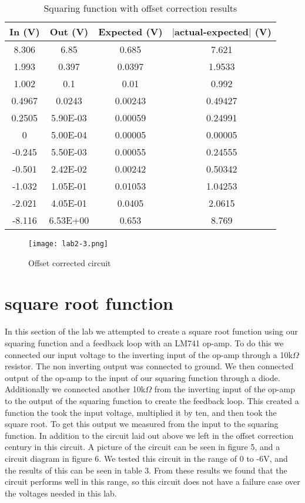 \documentclass[prl,12pt,notitlepage,aps,onecolumn,superscriptaddress]{revtex4-1}
\newcommand{\ohm}{$\Omega$ }
\begin{document}
\begin{table}[h]
 \centering
 \caption{Squaring function with offset correction results}
   \begin{tabular}{|c|c|c|c|}
   \toprule
 In (V)   & Out (V)  & Expected (V)  & $|$actual-expected$|$ (V) \\
   \midrule
   8.306 & 6.85  & 0.685 & 7.621 \\
   1.993 & 0.397 & 0.0397 & 1.9533 \\
   1.002 & 0.1   & 0.01  & 0.992 \\
   0.4967 & 0.0243 & 0.00243 & 0.49427 \\
   0.2505 & 5.90E-03 & 0.00059 & 0.24991 \\
   0     & 5.00E-04 & 0.00005 & 0.00005 \\
   -0.245 & 5.50E-03 & 0.00055 & 0.24555 \\
   -0.501 & 2.42E-02 & 0.00242 & 0.50342 \\
   -1.032 & 1.05E-01 & 0.01053 & 1.04253 \\
   -2.021 & 4.05E-01 & 0.0405 & 2.0615 \\
   -8.116 & 6.53E+00 & 0.653 & 8.769 \\
   \bottomrule
   \end{tabular}%
 \label{tab:addlabel}%
\end{table}%

\begin{figure}[h]
\begin{center}
\texttt{[image: lab2-3.png]}
\end{center}
\caption{\label{fig:pic} Offset corrected circuit}
\end{figure}

\section{square root function}
In this section of the lab we attempted to create a square root function using our squaring function and a feedback loop with an LM741 op-amp. To do this we connected our input voltage to the inverting input of the op-amp through a 10k\ohm resistor. The non inverting output was connected to ground. We then connected output of the op-amp to the input of our squaring function through a diode. Additionally we connected another 10k\ohm from the inverting input of the op-amp to the output of the squaring function to create the feedback loop. This created a function the took the input voltage, multiplied it by ten, and then took the square root. To get this output we measured from the input to the squaring function. In addition to the circuit laid out above we left in the offset correction century in this circuit. A picture of the circuit can be seen in figure 5, and a circuit diagram in figure 6. We tested this circuit in the range of 0 to -6V, and the results of this can be seen in table 3. From these results we found that the circuit performs well in this range, so this circuit does not have a failure case over the voltages needed in this lab.
\end{document}
